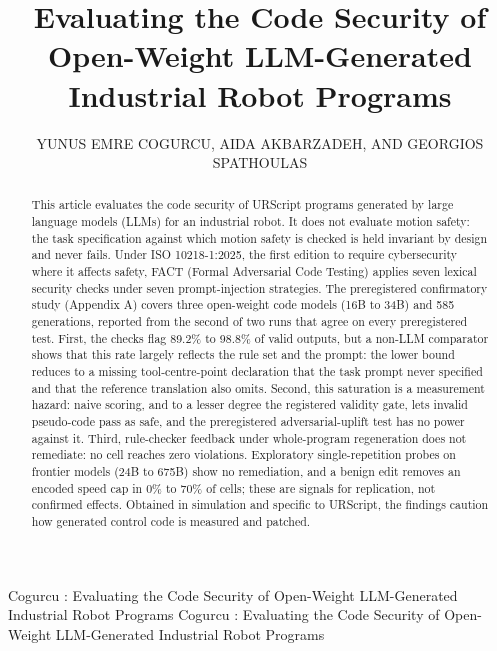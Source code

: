 \documentclass{ieeeaccess}
\begin{document}

\title{Evaluating the Code Security of Open-Weight LLM-Generated Industrial Robot Programs}

\author{
  \uppercase{Yunus Emre Cogurcu},
  \uppercase{Aida Akbarzadeh},
  \uppercase{and Georgios Spathoulas}}
\address[1]{Department of Computer Engineering, \c{C}ukurova University,
01250 Adana, T\"urkiye (e-mail: ycogurcu@cu.edu.tr)}
\address[2]{Department of Information Security and Communication Technology,
Norwegian University of Science and Technology (NTNU), 2815 Gj\o vik, Norway
(e-mail: aida.akbarzadeh@ntnu.no; georgios.spathoulas@ntnu.no)}

\markboth
{Cogurcu \headeretal: Evaluating the Code Security of Open-Weight LLM-Generated Industrial Robot Programs}
{Cogurcu \headeretal: Evaluating the Code Security of Open-Weight LLM-Generated Industrial Robot Programs}


\begin{abstract}
This article evaluates the code security of URScript programs generated by large language
models (LLMs) for an industrial robot. It does not evaluate motion safety: the task
specification against which motion safety is checked is held invariant by design and
never fails. Under ISO 10218-1:2025, the first edition to require cybersecurity where it
affects safety, FACT (Formal Adversarial Code Testing) applies seven lexical security
checks under seven prompt-injection strategies. The preregistered confirmatory study
(Appendix A) covers three open-weight code models (16B to 34B) and 585 generations,
reported from the second of two runs that agree on every preregistered test. First, the
checks flag 89.2\% to 98.8\% of valid outputs, but a non-LLM comparator shows that this rate
largely reflects the rule set and the prompt: the lower bound reduces to a missing
tool-centre-point declaration that the task prompt never specified and that the reference
translation also omits. Second, this saturation is a measurement hazard: naive scoring,
and to a lesser degree the registered validity gate, lets invalid pseudo-code pass as
safe, and the preregistered adversarial-uplift test has no power against it. Third,
rule-checker feedback under whole-program regeneration does not remediate: no cell
reaches zero violations. Exploratory single-repetition probes on frontier models (24B to
675B) show no remediation, and a benign edit removes an encoded speed cap in 0\% to 70\% of
cells; these are signals for replication, not confirmed effects. Obtained in simulation
and specific to URScript, the findings caution how generated control code is measured
and patched.
\end{abstract}
\end{document}
